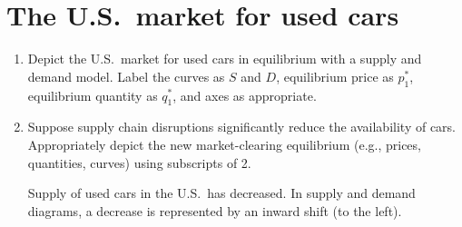 \documentclass{assignment}
\date{Friday 7 October 2022}
\begin{document}
\RaggedRight

\beginsolutions{}

\section{The U.S.~market for used cars}

\begin{enumerate}

\item Depict the U.S.~market for used cars in equilibrium with a supply and demand model. Label the curves as $S$ and $D$, equilibrium price as $p^*_1$, equilibrium quantity as $q^*_1$, and axes as appropriate.

\begin{solution}
\begin{center}
\end{center}
\vspace{-12pt}
\end{solution}

\item Suppose supply chain disruptions significantly reduce the availability of cars. Appropriately depict the new market-clearing equilibrium (e.g., prices, quantities, curves) using subscripts of 2.

\begin{solution}
Supply of used cars in the U.S.~has decreased. In supply and demand diagrams, a decrease is represented by an inward shift (to the left).

\begin{center}
\end{center}
\vspace{-12pt}
\end{solution}


\end{enumerate}
\end{document}
